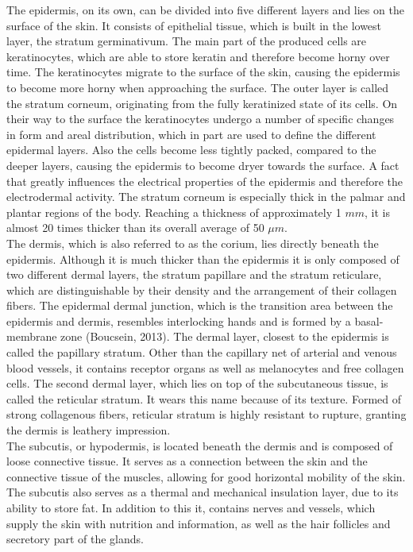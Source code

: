 The epidermis, on its own, can be divided into five different layers and lies on the surface of the skin. It consists of epithelial tissue, which is built in the lowest layer, the stratum germinativum. The main part of the produced cells are keratinocytes, which are able to store keratin and therefore become horny over time. The keratinocytes migrate to the surface of the skin, causing the epidermis to become more horny when approaching the surface. The outer layer is called the stratum corneum, originating from the fully keratinized state of its cells.
On their way to the surface the keratinocytes undergo a number of specific changes in form and areal  distribution, which in part are used to define the different epidermal layers. Also the cells become less tightly packed, compared to the deeper layers, causing the epidermis to become dryer towards the surface. A fact that greatly influences the electrical properties of the epidermis and therefore the  electrodermal activity. The stratum corneum is especially thick in the palmar and plantar regions of the body. Reaching a thickness of approximately 1 $mm$, it is almost 20 times thicker than its overall average of 50 $\mu m$.\\
The dermis, which is also referred to as the corium, lies directly beneath the epidermis. Although it is much thicker than the epidermis it is only composed of two different dermal layers, the stratum papillare and the stratum reticulare, which are distinguishable by their density and the arrangement of their collagen fibers. The epidermal dermal junction, which is the transition area between the epidermis and dermis, resembles interlocking hands and is formed by a basal-membrane zone (Boucsein, 2013).
The dermal layer, closest to the epidermis is called the papillary stratum. Other than the capillary net of arterial and venous blood vessels, it contains receptor organs as well as melanocytes and free collagen cells. The second dermal layer, which lies on top of the subcutaneous tissue, is called the reticular stratum. It wears this name because of its texture. Formed of strong collagenous fibers, reticular stratum is highly resistant to rupture, granting the dermis is leathery impression.\\

The subcutis, or hypodermis, is located beneath the dermis and is composed of loose connective tissue. It serves as a connection between the skin and the connective tissue of the muscles, allowing for good horizontal mobility of the skin. The subcutis also serves as a thermal and mechanical insulation layer, due to its ability to store fat. In addition to this it, contains nerves and vessels, which supply the skin with nutrition and information, as well as the hair follicles and secretory part of the glands.   

